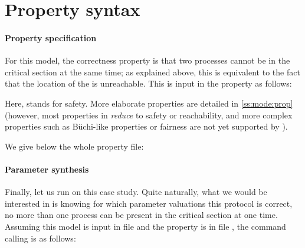 \section{Property syntax}

\paragraph{Property specification}
For this model, the correctness property is that two processes cannot be in the critical section at the same time; as explained above, this is equivalent to the fact that the  location of the  \IPTA{} is unreachable.
This is input in the property as follows:
\begin{center}
\end{center}
Here,  stands for safety.
More elaborate properties are detailed in \cref{ss:mode:prop} (however, most properties in \imitator{} \emph{reduce} to safety or reachability, and more complex properties such as Büchi-like properties or fairness are not yet supported by \imitator{}).

We give below the whole property file:




\paragraph{Parameter synthesis}
Finally, let us run \imitator{} on this case study.
Quite naturally, what we would be interested in is knowing for which parameter valuations this protocol is correct, \ie{} no more than one process can be present in the critical section at one time.
Assuming this model is input in file  and the property is in file , the command calling \imitator{} is as follows:



